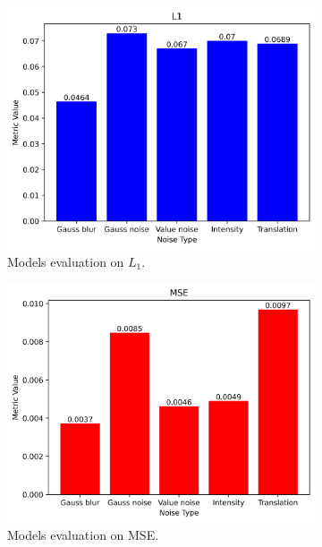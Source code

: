 \begin{figure}[H]\centering
  \begin{subfigure}[t]{0.45\textwidth}
    \centering
    \includegraphics[width=\linewidth]{img/ten-trials/losses/augmentation_L1.png}
    \caption{Models evaluation on $L_1$.}
  \end{subfigure}
  \begin{subfigure}[t]{0.45\textwidth}
    \centering
    \includegraphics[width=\linewidth]{img/ten-trials/losses/augmentation_MSE.png}
    \caption{Models evaluation on MSE.}
  \end{subfigure}
  \\
  \begin{subfigure}[t]{0.45\textwidth}

\end{subfigure}
\end{figure}

